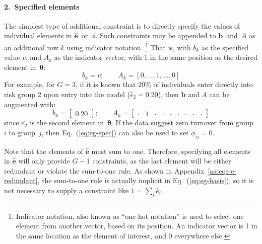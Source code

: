 \paragraph{2.~Specified elements}
\label{con:spec-element}
The simplest type of additional constraint is to
directly specify the values of individual elements in $\bm{\hat{e}}$~or~$\phi$.
Such constraints may be appended to $\bm{b}$~and~$A$
as an additional row $k$ using indicator notation.%
\footnote{Indicator notation, also known as ``one-hot notation'' is used to
  select one element from another vector, based on its position.
  An indicator vector is 1 in the same location as the element of interest,
  and 0 everywhere else.}
That is, with $b_k$ as the specified value $v$,
and $A_k$ as the indicator vector,
with $1$ in the same position as the desired element in~$\bm{\theta}$:
\begin{equation}\label{eq:spec-elem}
b_k = v;\qquad
A_k = [0,\dots,1,\dots,0]
\end{equation}
For example, for $G = 3$, if it is known that 20\% of individuals
enter directly into risk group $2$ upon entry into the model ($\hat{e}_2 = 0.20$),
then $\bm{b}$ and $A$ can be augmented with:
\begin{equation}\label{eq:eg-spec}
b_k = \left[\begin{array}{c} 0.20 \end{array}\right];\qquad
A_k = \left[\begin{array}{ccccccccc}
  \cdot & 1 & \cdot & \cdot & \cdot & \cdot & \cdot & \cdot & \cdot
\end{array}\right] 
\end{equation}
since $\hat{e}_2$ is the second element in~$\bm{\theta}$.
If the data suggest zero turnover from group~$i$ to group~$j$,
then Eq.~(\ref{eq:eg-spec}) can also be used to set $\phi_{ij} = 0$.
\par
Note that the elements of $\bm{\hat{e}}$ must sum to one.
Therefore, specifying all elements in $\bm{\hat{e}}$
will only provide $G-1$ constraints,
as the last element will be either redundant or violate the sum-to-one rule.
As shown in Appendix~\ref{aa:eqs-e-redundant},
the sum-to-one rule is actually implicit in Eq.~(\ref{eq:eg-basis}),
so it is not necessary to supply a constraint like $1 = \sum_{i} \hat{e}_i$.
